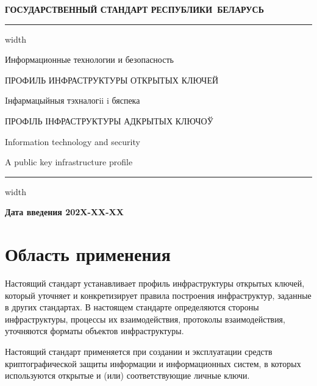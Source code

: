\begin{center}
{\bfseries
ГОСУДАРСТВЕННЫЙ СТАНДАРТ РЕСПУБЛИКИ~БЕЛАРУСЬ
\vskip 2pt
\hrule width\textwidth

\vskip 9pt

Информационные технологии и безопасность

ПРОФИЛЬ ИНФРАСТРУКТУРЫ ОТКРЫТЫХ КЛЮЧЕЙ

\vskip 9pt

Iнфармацыйныя тэхналогii i бяспека

ПРОФІЛЬ ІНФРАСТРУКТУРЫ АДКРЫТЫХ КЛЮЧОЎ
} %

\vskip 9pt

Information technology and security

A public key infrastructure profile

\vskip 4pt                
\hrule width \textwidth
\end{center}

\mbox{}\hfill{\bfseries Дата введения 202X-XX-XX}

\chapter{Область применения}

Настоящий стандарт устанавливает профиль инфраструктуры открытых ключей,
который уточняет и конкретизирует правила построения инфраструктур,
заданные в других стандартах. 
%
В настоящем стандарте определяются стороны инфраструктуры, процессы их 
взаимодействия, протоколы взаимодействия, уточняются форматы объектов 
инфраструктуры.

Настоящий стандарт применяется при создании и эксплуатации средств
криптографической защиты информации и информационных систем, в которых
используются открытые и (или) соответствующие личные ключи.

